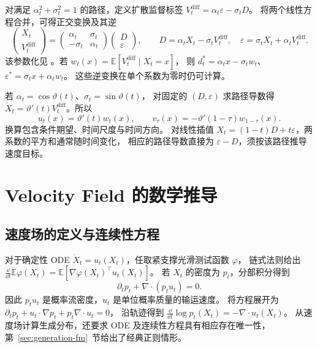 对满足 \(\alpha_t^2+\sigma_t^2=1\) 的路径，定义扩散监督标签
\(V_t^{\mathrm{diff}}=\alpha_t\varepsilon-\sigma_tD\)。
将两个线性方程合并，可得正交变换及其逆
\begin{equation}
 \begin{pmatrix}X_t\\V_t^{\mathrm{diff}}\end{pmatrix}
 =\begin{pmatrix}\alpha_t&\sigma_t\\-\sigma_t&\alpha_t\end{pmatrix}
   \begin{pmatrix}D\\\varepsilon\end{pmatrix},\qquad
 D=\alpha_tX_t-\sigma_t V_t^{\mathrm{diff}},\quad
 \varepsilon=\sigma_tX_t+\alpha_t V_t^{\mathrm{diff}}.
 \label{eq:fields-vpred-rotation}
\end{equation}
该参数化见 \cite{salimans2022distill}。若 \(w_t(x)=\mathbb E[V_t^{\mathrm{diff}}\mid X_t=x]\)，
则 \(d_t^*=\alpha_tx-\sigma_tw_t\)、
\(\varepsilon^*=\sigma_tx+\alpha_tw_t\)。
这些逆变换在单个系数为零时仍可计算。

若 \(\alpha_t=\cos\vartheta(t)\)、\(\sigma_t=\sin\vartheta(t)\)，
对固定的 \((D,\varepsilon)\) 求路径导数得
\(\dot X_t=\vartheta'(t)V_t^{\mathrm{diff}}\)。所以
\[
 u_t(x)=\vartheta'(t)w_t(x),\qquad
 v_\tau(x)=-\vartheta'(1-\tau)w_{1-\tau}(x).
\]
换算包含条件期望、时间尺度与时间方向。
对线性插值 \(X_t=(1-t)D+t\varepsilon\)，两系数的平方和通常随时间变化，
相应的路径导数直接为 \(\varepsilon-D\)，须按该路径推导速度目标。

\section{Velocity Field 的数学推导}
\label{sec:fields-velocity}

\subsection{速度场的定义与连续性方程}

对于确定性 ODE \(\dot X_t=u_t(X_t)\)，任取紧支撑光滑测试函数 \(\varphi\)，
链式法则给出
\(\frac{\dd}{\dd t}\mathbb E\varphi(X_t)=\mathbb E[\nabla\varphi(X_t)^\top u_t(X_t)]\)。
若 \(X_t\) 的密度为 \(p_t\)，分部积分得到
\begin{equation}
 \partial_t p_t+\nabla\cdot(p_tu_t)=0.
 \label{eq:fields-continuity}
\end{equation}
因此 \(p_tu_t\) 是概率流密度，\(u_t\) 是单位概率质量的输运速度。
将方程展开为 \(\partial_t p_t+u_t\cdot\nabla p_t+p_t\nabla\cdot u_t=0\)，
沿轨迹得到 \(\frac{\dd}{\dd t}\log p_t(X_t)=-\nabla\cdot u_t(X_t)\)。
从速度场计算生成分布，还要求 ODE 及连续性方程具有相应存在唯一性，
第~\ref{sec:generation-fm}~节给出了经典正则情形。

